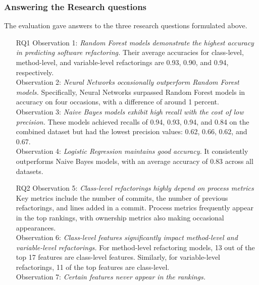 \subsubsection{Answering the Research questions}
The evaluation gave answers to the three research questions formulated above.
\begin{itemize}
    \item[RQ1] Observation 1: \textit{Random Forest models demonstrate the highest accuracy in predicting software refactoring.} Their average accuracies for class-level, method-level, and variable-level refactorings are 0.93, 0.90, and 0.94, respectively.\\Observation 2: \textit{Neural Networks occasionally outperform Random Forest models.} Specifically, Neural Networks surpassed Random Forest models in accuracy on four occasions, with a difference of around 1 percent.\\ Observation 3: \textit{Naive Bayes models exhibit high recall with the cost of low precision.} These models achieved recalls of 0.94, 0.93, 0.94, and 0.84 on the combined dataset but had the lowest precision values: 0.62, 0.66, 0.62, and 0.67.\\ Observation 4: \textit{Logistic Regression maintains good accuracy.} It consistently outperforms Naive Bayes models, with an average accuracy of 0.83 across all datasets.
    \item[RQ2] Observation 5: \textit{Class-level refactorings highly depend on process metrics} Key metrics include the number of commits, the number of previous refactorings, and lines added in a commit. Process metrics frequently appear in the top rankings, with ownership metrics also making occasional appearances.\\ Observation 6: \textit{Class-level features significantly impact method-level and variable-level refactorings.} For method-level refactoring models, 13 out of the top 17 features are class-level features. Similarly, for variable-level refactorings, 11 of the top features are class-level.\\ Observation 7: \textit{Certain features never appear in the rankings.}

\end{itemize}
